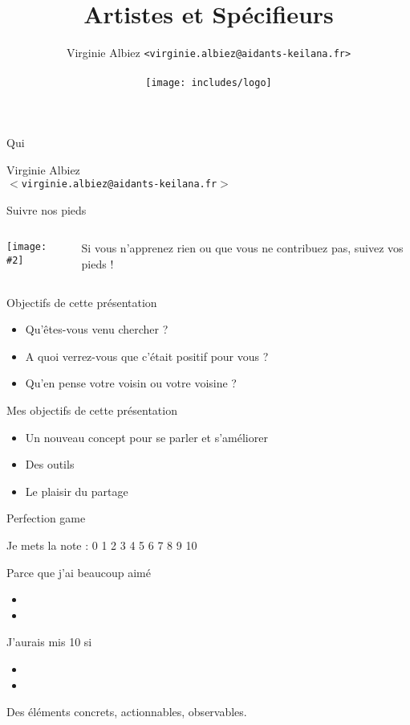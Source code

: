 \documentclass{beamer}
\title{Artistes et Spécifieurs}
\author{
  Virginie Albiez \texttt{<virginie.albiez@aidants-keilana.fr>} \\
  \\[5mm]
  \texttt{[image: includes/logo]} \hfill
}
\newcommand\twocolumns[3]{
  \FPeval{\leftsize}{#1}
  \FPeval{\rightsize}{1 - #1}

  \begin{columns}
    \begin{column}{\leftsize\textwidth}
      #2
    \end{column}
    \begin{column}{\rightsize\textwidth}
      #3
    \end{column}
  \end{columns}
}
\newcommand{\singleimage}[2][\textwidth]{ \center \texttt{[image: \#2]} }
\begin{document}
\frame{\titlepage}


\begin{frame}{Qui}
  \begin{center}
    Virginie Albiez \\
    \texttt{$<$virginie.albiez@aidants-keilana.fr$>$} \\
  \end{center}
\end{frame}


\begin{frame}{Suivre nos pieds}
  \twocolumns{0.3}{
    \singleimage{includes/foots.png}
  }{
    \Large{Si vous n’apprenez rien ou que vous ne contribuez pas, suivez vos pieds !}
  }
\end{frame}


\begin{frame}{Objectifs de cette présentation}
  \begin{itemize}[<+->]
    \item Qu'êtes-vous venu chercher ?
    \item A quoi verrez-vous que c'était positif pour vous ?
    \item Qu'en pense votre voisin ou votre voisine ?
  \end{itemize}
\end{frame}


\begin{frame}{Mes objectifs de cette présentation}
  \begin{itemize}[<+->]
    \item Un nouveau concept pour se parler et s'améliorer
    \item Des outils
    \item Le plaisir du partage
  \end{itemize}
\end{frame}


\begin{frame}{Perfection game}

  \begin{block}{Je mets la note : }
    0 1 2 3 4 5 6 \alert{7} 8 9 10
  \end{block}
  \begin{block}{Parce que j'ai beaucoup aimé}
      \begin{itemize}
        \item
        \item
      \end{itemize}
  \end{block}
  \begin{block}{J'aurais mis 10 si}
      \begin{itemize}
        \item
        \item
      \end{itemize}
  \end{block}


    Des éléments concrets, actionnables, observables.
\end{frame}
\end{document}

